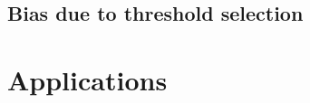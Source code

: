 \subsection{Bias due to threshold selection}

%
%
%



\section{Applications}
\label{sec:7:applications}

